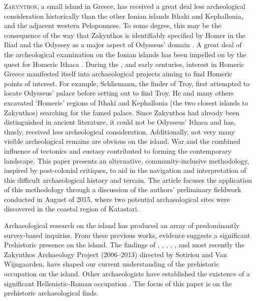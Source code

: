 	
\lettrine[nindent=0em,lines=3]{Z}{akynthos}, a small island in Greece, has received a great deal less archeological consideration historically than the other Ionian islands Ithaki and Kephallonia, and the adjacent western Peloponnese. To some degree, this may be the consequence of the way that Zakynthos is identifiably specified by Homer in the Iliad and the Odyssey as a major aspect of Odysseus' domain \parencite{VanWijngaarden_2013}. A great deal of the archeological examination on the Ionian islands has been impelled on by the quest for Homeric Ithaca \parencite[9]{Souyoudzouglou-Haywood_1999}. During the ,  and early  centuries, interest in Homeric Greece manifested itself into archaeological projects aiming to find Homeric points of interest. For example, Schliemann, the finder of Troy, first attempted to locate Odysseus’ palace before setting out to find Troy. He and many others excavated ‘Homeric’ regions of Ithaki and Kephallonia (the two closest islands to Zakynthos) searching for the famed palace. Since Zakynthos had already been distinguished in ancient literature, it could not be Odysseus’ Ithaca and has, thusly, received less archeological consideration. Additionally, not very many visible archeological remains are obvious on the island. War and the combined influence of tectonics and eustasy contributed to forming the contemporary landscape. This paper presents an alternative, community-inclusive methodology, inspired by post-colonial critiques, to aid in the navigation and interpretation of this difficult archaeological history and terrain. The article focuses the application of this methodology through a discussion of the authors’ preliminary fieldwork conducted in August of 2015, where two potential archaeological sites were discovered in the coastal region of Katastari.
	
	
Archaeological research on the island has produced an array of predominantly survey-based inquiries. From these previous works, evidence suggests a significant Prehistoric presence on the island. The findings of \textcite{Riemann_1879}, \textcite{Benton_1933}, \textcite{Zapfe_1937}, \textcite{Sordinas_1970}, \textcite{Agallopoulou_1973}, and most recently the Zakynthos Archaeology Project (2006--2013) directed by Sotiriou and Van Wijngaarden, have shaped our current understanding of the prehistoric occupation on the island.  Other archaeologists have established the existence of a significant Hellenistic-Roman occupation \parencites{Daux_1958}{Mylonas_1991}{Kalligas_1993}{Arapoyianni_1991}{Arapoyianni_1992}.  The focus of this paper is on the prehistoric archaeological finds. 
	

